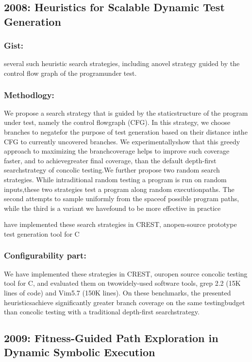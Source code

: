 \documentclass[	runningheads,
				a4paper]{llncs}
\begin{document}
\subsection{2008: Heuristics for Scalable Dynamic Test Generation}

\subsubsection{Gist:}
several  such  heuristic  search  strategies,  including  anovel strategy guided by the control flow graph of the programunder test. 

\subsubsection{Methodlogy:}
We  propose  a  search  strategy  that  is  guided  by  the  staticstructure  of  the  program  under  test,  namely  the  control  flowgraph  (CFG).  In  this  strategy,  we  choose  branches  to  negatefor  the  purpose  of  test  generation  based  on  their  distance  inthe CFG to currently uncovered branches. We experimentallyshow  that  this  greedy  approach  to  maximizing  the  branchcoverage helps to improve such coverage faster, and to achievegreater   final   coverage,   than   the   default   depth-first   searchstrategy of concolic testing.We further propose two random search strategies. While intraditional random testing a program is run on random inputs,these  two  strategies  test  a  program  along  random  executionpaths. The second attempts to sample uniformly from the spaceof possible program paths, while the third is a variant we havefound to be more effective in practice

have implemented these search strategies in CREST, anopen-source prototype test generation tool for C

\subsubsection{Configurability part:}
We have implemented these strategies in CREST, ouropen source concolic testing tool for C, and evaluated them on twowidely-used software tools, grep 2.2 (15K lines of code) and Vim5.7 (150K lines). On these benchmarks, the presented heuristicsachieve significantly greater branch coverage on the same testingbudget than concolic testing with a traditional depth-first searchstrategy.


\subsection{2009: Fitness-Guided Path Exploration in Dynamic Symbolic Execution}
\end{document}
